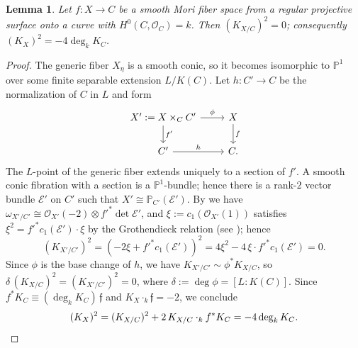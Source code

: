 \documentclass[reqno,oneside]{amsart}
\newtheorem{lemma}[theorem]{Lemma}
\theoremstyle{definition}
\theoremstyle{plain}
\numberwithin{equation}{section}
\begin{document}
\begin{lemma}\label{lemma-KXC-square}
  Let $f\colon X\to C$ be a smooth Mori fiber space from a regular projective surface onto a curve with $H^0(C,\mathcal O_C)=k$.
  Then $(K_{X/C})^2=0$; consequently $(K_X)^2=-4\deg_kK_C$.
\end{lemma}
\begin{proof}
  The generic fiber $X_\eta$ is a smooth conic, so it becomes isomorphic to $\mathbb P^1$ over some finite separable extension $L/K(C)$.
  Let $h\colon C'\to C$ be the normalization of $C$ in $L$ and form
  \[
    \begin{tikzcd}
      X':=X\times_C C' \rar{\phi}\dar{f'} & X \dar{f} \\
      C' \rar{h} & C .
    \end{tikzcd}
  \]
  The $L$-point of the generic fiber extends uniquely to a section of $f'$.
  A smooth conic fibration with a section is a $\mathbb P^1$-bundle; hence there is a rank-$2$ vector bundle $\mathcal E'$ on $C'$ such that $X'\cong\mathbb P_{C'}(\mathcal E')$.
  By \cite[Exercise~III.8.4(b)]{Hartshorne-AG} we have $\omega_{X'/C'}\cong\mathcal O_{X'}(-2)\otimes f'^*\det\mathcal E'$, and $\xi:=c_1(\mathcal O_{X'}(1))$ satisfies $\xi^2= f'^*c_1(\mathcal E')\cdot\xi$ by the Grothendieck relation (see \cite[\S A.3]{Hartshorne-AG}); hence
  \[
    (K_{X'/C'})^2=(-2\xi+ f'^*c_1(\mathcal E'))^2=4\xi^2-4\,\xi\cdot f'^*c_1(\mathcal E')=0 .
  \]
  Since $\phi$ is the base change of $h$, we have $K_{X'/C'} \sim \phi^*K_{X/C}$, so $\delta\,(K_{X/C})^2=(K_{X'/C'})^2=0$, where $\delta:=\deg\phi=[L:K(C)]$.
  Since $f^*K_C\equiv(\deg_k K_C)\,\mathfrak f$ and $K_X\cdot_k\mathfrak f=-2$, we conclude
  \[
    (K_X)^2=(K_{X/C})^2+2\,K_{X/C}\cdot_k f^*K_C = -4\deg_k K_C .
    \qedhere
  \]
\end{proof}
\end{document}
